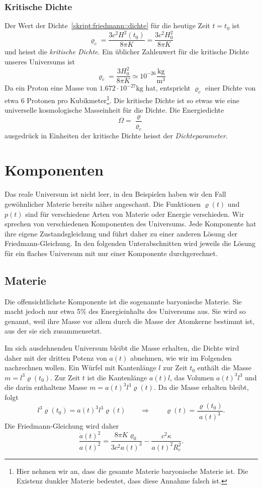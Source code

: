 \subsubsection{Kritische Dichte}
Der Wert der Dichte~\eqref{skript:friedmann::dichte}
für die heutige Zeit $t=t_0$ ist
\[
\varrho_c = \frac{3c^2H^2(t_0)}{8\pi K}=\frac{3c^2H_0^2}{8\pi K}
\]
und heisst die {\em kritische Dichte}.
Ein üblicher Zahlenwert für die kritische Dichte unseres Universums ist
\[
\varrho_c = \frac{3H_0^2}{8\pi K}\simeq 10^{-26}\frac{\text{kg}}{\text{m}^3}
\]
Da ein Proton eine Masse von $1.672\cdot 10^{-27}\text{kg}$ hat, entspricht
$\varrho_c$ einer Dichte von etwa $6$ Protonen pro Kubikmeter\footnote{%
Hier nehmen wir an, dass die gesamte Materie baryonische Materie ist.
Die Existenz dunkler Materie bedeutet, dass diese Annahme falsch ist.
}.
Die kritische Dichte ist so etwas wie eine universelle kosmologische
Masseinheit für die Dichte.
Die Energiedichte
\[
\Omega=\frac{\varrho}{\varrho_c}
\]
ausgedrück in Einheiten der kritische Dichte heisst
der {\em Dichteparameter}.

\section{Komponenten}
Das reale Universum ist nicht leer, in den Beispielen haben wir den
Fall gewöhnlicher Materie bereits näher angeschaut.
Die Funktionen $\varrho(t)$ und $p(t)$ sind für verschiedene
Arten von Materie oder Energie verschieden.
Wir sprechen von verschiedenen Komponenten des Universums.
Jede Komponente hat ihre eigene Zustandsgleichung und führt
daher zu einer anderen Lösung der Friedmann-Gleichung.
In den folgenden Unterabschnitten wird jeweils die Lösung für
ein flaches Universum mit nur einer Komponente durchgerechnet.

\subsection{Materie}
Die offensichtlichste Komponente ist die sogenannte baryonische Materie.
Sie macht jedoch nur etwa 5\% des Energieinhalts des Universums aus.
Sie wird so genannt, weil ihre Masse vor allem durch die Masse der Atomkerne
bestimmt ist, aus der sie sich zusammensetzt.

Im sich ausdehnenden Universum bleibt die Masse erhalten, die Dichte wird
daher mit der dritten Potenz von $a(t)$ abnehmen, wie wir im Folgenden
nachrechnen wollen.
Ein Würfel mit Kantenlänge $l$ zur Zeit $t_0$ enthält die Masse
$m=l^3 \varrho(t_0)$.
Zur Zeit $t$ ist die Kantenlänge $a(t)l$, das Volumen $a(t)^3l^3$
und die darin enthaltene Masse $m=a(t)^3l^3\varrho(t)$.
Da die Masse erhalten bleibt, folgt
\[
l^3 \varrho(t_0)
=
a(t)^3l^3\varrho(t)
\qquad\Rightarrow\qquad
\varrho(t)=\frac{\varrho(t_0)}{a(t)^3}.
\]
Die Friedmann-Gleichung wird daher
\begin{equation}
\frac{\dot a(t)^2}{a(t)^2}
=
\frac{8\pi K\varrho_0}{3c^2a(t)^3}-\frac{c^2\kappa}{a(t)^2R_c^2}.
\end{equation}

